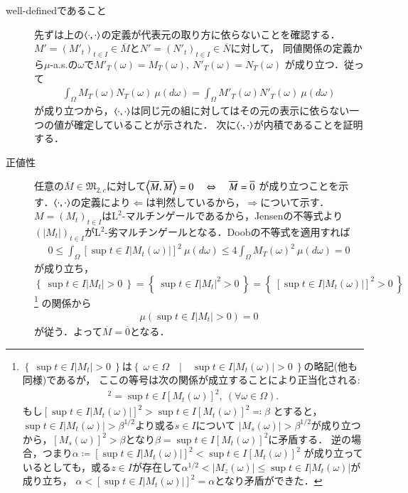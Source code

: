 \begin{description}
			\begin{prf}\mbox{}
				\begin{description}
					\item[well-definedであること]
						先ずは上の$\inprod<\cdot,\cdot>$の定義が代表元の取り方に依らないことを確認する．
						$M' = (M'_t)_{t \in I} \in \overline{M}$と$N' = (N'_t)_{t \in I} \in \overline{N}$に対して，
						同値関係の定義から$\mu$-a.s.の$\omega$で$M'_T(\omega) = M_T(\omega),\ N'_T(\omega) = N_T(\omega)$
						が成り立つ．従って
						\begin{align}
							\int_{\Omega} M_T(\omega)N_T(\omega)\ \mu(d\omega) = \int_{\Omega} M'_T(\omega)N'_T(\omega)\ \mu(d\omega)
						\end{align}
						が成り立つから，$\inprod<\cdot,\cdot>$は同じ元の組に対してはその元の表示に依らない一つの値が確定していることが示された．
						次に$\inprod<\cdot,\cdot>$が内積であることを証明する．
			
					\item[正値性]
						任意の$\overline{M} \in \mathfrak{M}_{2,c}$に対して$\inprod<\overline{M},\overline{M}> = 0 \quad \Leftrightarrow \quad \overline{M} = \overline{0}$
						が成り立つことを示す．$\inprod<\cdot,\cdot>$の定義により$\Leftarrow$は判然しているから，$\Rightarrow$について示す．
						$M = (M_t)_{t \in I}$は$\mathrm{L}^2$-マルチンゲールであるから，Jensenの不等式より
						$(|M_t|)_{t \in I}$が$\mathrm{L}^2$-劣マルチンゲールとなる．Doobの不等式を適用すれば
						\begin{align}
							0 \leq \int_{\Omega} [\sup{t \in I}{|M_t(\omega)|}]^2\ \mu(d\omega) \leq 4 \int_{\Omega} {M_T(\omega)}^2\ \mu(d\omega) = 0
						\end{align}
						が成り立ち，$\left\{\ \sup{t \in I}{|M_t|} > 0\ \right\} = \left\{\ \sup{t \in I}{|M_t|^2} > 0\ \right\} = \left\{\ [\sup{t \in I}{|M_t(\omega)|}]^2 > 0\ \right\}$
						\footnote{
							$\left\{\ \sup{t \in I}{|M_t|} > 0\ \right\}$は$\left\{\ \omega \in \Omega\quad |\quad \sup{t \in I}{|M_t(\omega)|} > 0\ \right\}$の略記(他も同様)であるが，
							ここの等号は次の関係が成立することにより正当化される:
							\begin{align}
								[\sup{t \in I}{|M_t(\omega)|}]^2 = \sup{t \in I}{[M_t(\omega)]^2},\ (\forall \omega \in \Omega).
							\end{align}
							もし$[\sup{t \in I}{|M_t(\omega)|}]^2 > \sup{t \in I}{[M_t(\omega)]^2} \eqqcolon \beta$
							とすると，$\sup{t \in I}{|M_t(\omega)|} > \beta^{1/2}$より或る$s \in I$について
							$|M_s(\omega)| > \beta^{1/2}$が成り立つから，$[M_s(\omega)]^2 > \beta$となり$\beta = \sup{t \in I}{[M_t(\omega)]^2}$に矛盾する．
							逆の場合，つまり$\alpha \coloneqq [\sup{t \in I}{|M_t(\omega)|}]^2 < \sup{t \in I}{[M_t(\omega)]^2}$
							が成り立っているとしても，或る$z \in I$が存在して$\alpha^{1/2} < |M_z(\omega)| \leq \sup{t \in I}{|M_t(\omega)|}$が成り立ち，
							$\alpha < [\sup{t \in I}{|M_t(\omega)|}]^2 = \alpha$となり矛盾ができた．
						}
						の関係から
						\begin{align}
							\mu(\sup{t \in I}{|M_t|} > 0) = 0
						\end{align}
						が従う．よって$\overline{M} = \overline{0}$となる．
			

\end{description}
\end{prf}
\end{description}
